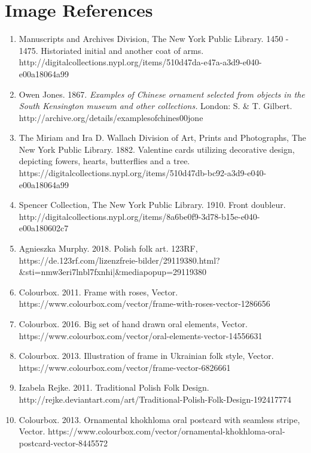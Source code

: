 \setcounter{secnumdepth}{0} %
\section{Image References}
\label{sec:image_references}

\footnotesize
\sloppy

\begin{enumerate}
    \item{Manuscripts and Archives Division, The New York Public Library. 1450 - 1475. Historiated initial and another coat of arms. http://digitalcollections.nypl.org/items/510d47da-e47a-a3d9-e040-e00a18064a99}
    \item{Owen Jones. 1867. \textit{Examples of Chinese ornament selected from objects in the South Kensington museum and other collections.} London: S. \& T. Gilbert. http://archive.org/details/examplesofchines00jone}
    \item{The Miriam and Ira D. Wallach Division of Art, Prints and Photographs, The New York Public Library. 1882. Valentine cards utilizing decorative design, depicting fowers, hearts, butterflies and a tree. https://digitalcollections.nypl.org/items/510d47db-bc92-a3d9-e040-e00a18064a99}
    \item{Spencer Collection, The New York Public Library. 1910. Front doubleur. http://digitalcollections.nypl.org/items/8a6be0f9-3d78-b15e-e040-e00a180602c7}
    \item {Agnieszka Murphy. 2018. Polish folk art. 123RF, https://de.123rf.com/lizenzfreie-bilder/29119380.html?\&sti=nmw3eri7lnbl7fxnhi|\&mediapopup=29119380}
    \item{Colourbox. 2011. Frame with roses, Vector. https://www.colourbox.com/vector/frame-with-roses-vector-1286656}
    \item{Colourbox. 2016. Big set of hand drawn oral elements, Vector. https://www.colourbox.com/vector/oral-elements-vector-14556631}
    \item{Colourbox. 2013. Illustration of frame in Ukrainian folk style, Vector. https://www.colourbox.com/vector/frame-vector-6826661}
    \item{Izabela Rejke. 2011. Traditional Polish Folk Design. http://rejke.deviantart.com/art/Traditional-Polish-Folk-Design-192417774}
    \item{Colourbox. 2013. Ornamental khokhloma oral postcard with seamless stripe, Vector. https://www.colourbox.com/vector/ornamental-khokhloma-oral-postcard-vector-8445572}


\end{enumerate}
